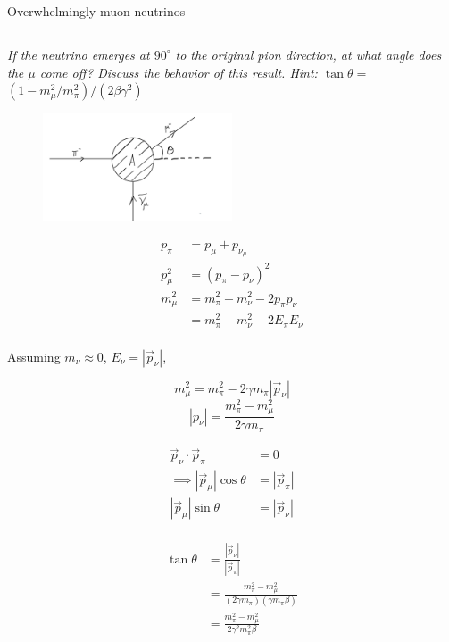 \documentclass{article}
\begin{document}
Overwhelmingly muon neutrinos

\subsection{} 
\textit{If the neutrino emerges at $90^{\circ}$ to the original pion direction, at what angle does the $\mu$ come off? Discuss the behavior of this result. Hint: $\tan \theta=$ $\left(1-m_{\mu}^{2} / m_{\pi}^{2}\right) /\left(2 \beta \gamma^{2}\right)$}


\begin{figure}[h!]
    \centering
    \includegraphics[width=0.5\textwidth]{figures/problem_9.png}
    \label{fig:my_label}
\end{figure}


\begin{align*}
    p_{\pi}&=p_{\mu}+p_{\nu_{\mu}}\\
    p_{\mu}^{2}&=\left(p_{\pi}-p_{\nu}\right)^{2}\\
    m_{\mu}^{2}&=m_{\pi}^{2}+m_{\nu}^{2}-2 p_{ \pi} p_{\nu}\\
    &= m_{\pi}^{2}+m_{\nu}^{2}-2 E_{\pi} E_{\nu} \\
\end{align*}

Assuming $m_{\nu} \approx 0$, $E_{\nu}=\left|\vec{p}_{\nu}\right|$, 

$$m_{\mu}^{2}=m_{\pi}^{2}-2 \gamma m_{\pi}\left|\vec{p}_{\nu}\right|$$
$$\left|p_{\nu}\right|=\frac{m_{\pi}^{2}-m_{\mu}^{2}}{2 \gamma m_{\pi}}$$

\begin{align*}
    \vec{p}_{\nu} \cdot \vec{p}_{\pi}&=0\\
    \implies \left|\vec{p}_{\mu}\right| \cos \theta&=\left|\vec{p}_{\pi}\right|\\
    \left|\vec{p}_{\mu}\right| \sin \theta&=\left|\vec{p}_{\nu}\right|\\
\end{align*}

\begin{align*}
    \tan \theta&=\frac{\left|\vec{p}_{\nu}\right|}{\left|\vec{p}_{\pi}\right|}\\
    &=\frac{m_{\pi}^{2}-m_{\mu}^{2}}{\left(2 \gamma m_\pi \right)\left(\gamma m_{\pi} \beta\right)}\\
    &= \frac{m_{\pi}^{2}-m_{\mu}^{2}}{2 \gamma^{2} m_{\pi}^{2} \beta}
\end{align*}
\end{document}
